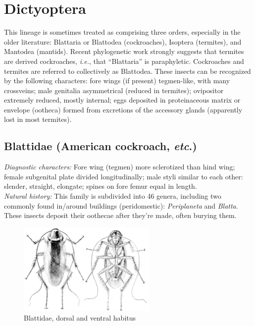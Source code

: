 \documentclass[letterpaper, 11pt]{article}
\begin{document}
\section{Dictyoptera}
This lineage is sometimes treated as comprising three orders, especially in the older literature: Blattaria or Blattodea (cockroaches), Isoptera (termites), and Mantodea (mantids). Recent phylogenetic work strongly suggests that termites are derived cockroaches, \textit{i.e.}, that ``Blattaria'' is paraphyletic. Cockroaches and termites are referred to collectively as Blattodea. These insects can be recognized by the following characters: fore wings (if present) tegmen-like, with many crossveins; male genitalia asymmetrical (reduced in termites); ovipositor extremely reduced, mostly internal; eggs deposited in proteinaceous matrix or envelope (ootheca) formed from excretions of the accessory glands (apparently lost in most termites).

\subsection{Blattidae (American cockroach, \textit{etc}.)}
\noindent{}\textit{Diagnostic characters:} Fore wing (tegmen) more sclerotized than hind wing; female subgenital plate divided longitudinally; male styli similar to each other: slender, straight, elongate; spines on fore femur equal in length.\\

\noindent{}\textit{Natural history:} This family is subdivided into 46 genera, including two commonly found in/around buildings (peridomestic): \textit{Periplaneta} and \textit{Blatta}. These insects deposit their oothecae after they're made, often burying them. \\

\begin{figure}[ht!]
  \centering
    \includegraphics[width=0.6\textwidth]{BlattidHabitus}
  \caption{Blattidae, dorsal and ventral habitus \citep[][Fig. 1]{bhl129194}}
  \label{fig:blattid1}
\end{figure}
\end{document}
